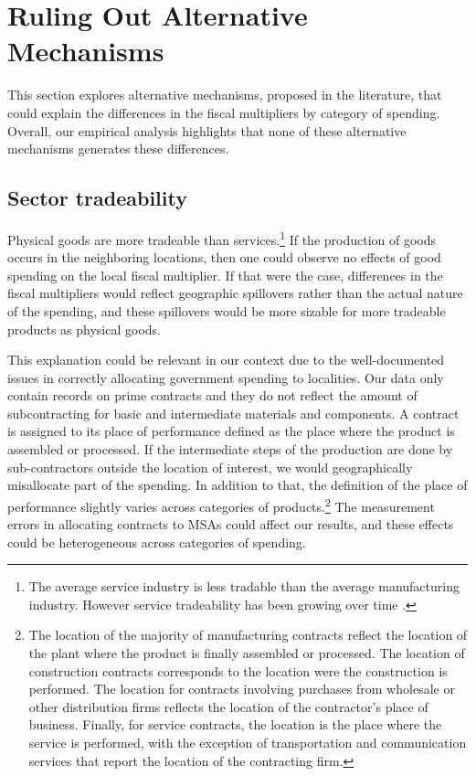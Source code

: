 \documentclass[dv_diss_main.tex]{subfiles}
\begin{document}
\section{Ruling Out Alternative Mechanisms}
\label{sec:emp_mec}

This section explores alternative mechanisms, proposed in the literature, that could explain the differences in the fiscal multipliers by category of spending. Overall, our empirical analysis highlights that none of these alternative mechanisms generates these differences.

\subsection{Sector tradeability}\label{subsec:outflow}

Physical goods are more tradeable than services.\footnote{The average service industry is less tradable than the
average manufacturing industry. However service tradeability has been growing over time \citep{gervais2019tradability}.} If the production of goods occurs in the neighboring locations, then one could observe no effects of good spending on the local fiscal multiplier. If that were the case, differences in the fiscal multipliers would reflect geographic spillovers rather than the actual nature of the spending, and these spillovers would be more sizable for more tradeable products as physical goods.

This explanation could be relevant in our context due to the well-documented issues in correctly allocating government spending to localities. Our data only contain records on prime contracts and they do not reflect the amount of subcontracting for basic and intermediate materials and components. A contract is assigned to its place of performance defined as the place where the product is assembled or processed. If the intermediate steps of the production  are done by sub-contractors outside the location of interest, we would geographically misallocate part of the spending. In addition to that, the definition of the place of performance slightly varies across categories of products.\footnote{The location of the majority of manufacturing contracts reflect the location of the plant where the product is finally assembled or processed. The location of construction contracts corresponds to the location were the construction is performed. The location for contracts involving purchases from wholesale or other distribution firms reflects the location of the contractor's place of business. Finally, for service contracts, the location is the place where the service is performed, with the exception of transportation and communication services that report the location of the contracting firm.} The measurement errors in allocating contracts to MSAs could affect our results, and these effects could be heterogeneous across categories of spending.
\end{document}
